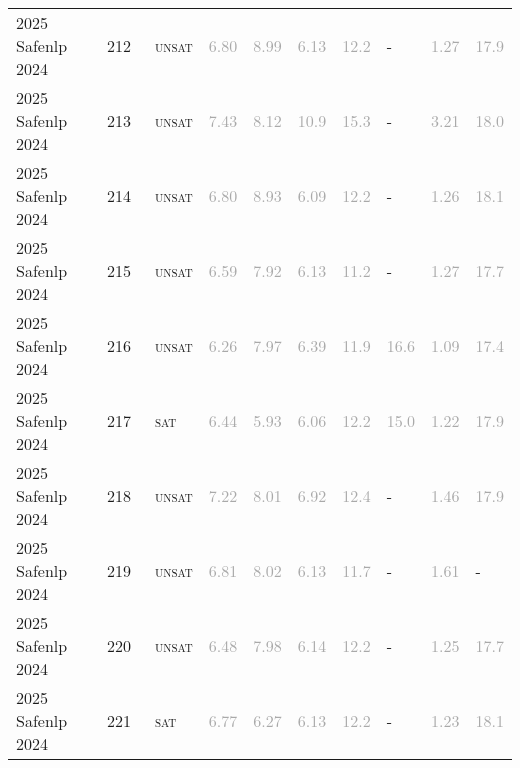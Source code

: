 \begin{center}
{\begin{longtable}{@{}llllllllll@{}}
2025 Safenlp 2024 & 212 & ~\textsc{unsat} & \textcolor{darkgray}{6.80} & \textcolor{darkgray}{8.99} & \textcolor{darkgray}{6.13} & \textcolor{darkgray}{12.2} & - & \textcolor{darkgray}{1.27} & \textcolor{darkgray}{17.9} \\
2025 Safenlp 2024 & 213 & ~\textsc{unsat} & \textcolor{darkgray}{7.43} & \textcolor{darkgray}{8.12} & \textcolor{darkgray}{10.9} & \textcolor{darkgray}{15.3} & - & \textcolor{darkgray}{3.21} & \textcolor{darkgray}{18.0} \\
2025 Safenlp 2024 & 214 & ~\textsc{unsat} & \textcolor{darkgray}{6.80} & \textcolor{darkgray}{8.93} & \textcolor{darkgray}{6.09} & \textcolor{darkgray}{12.2} & - & \textcolor{darkgray}{1.26} & \textcolor{darkgray}{18.1} \\
2025 Safenlp 2024 & 215 & ~\textsc{unsat} & \textcolor{darkgray}{6.59} & \textcolor{darkgray}{7.92} & \textcolor{darkgray}{6.13} & \textcolor{darkgray}{11.2} & - & \textcolor{darkgray}{1.27} & \textcolor{darkgray}{17.7} \\
2025 Safenlp 2024 & 216 & ~\textsc{unsat} & \textcolor{darkgray}{6.26} & \textcolor{darkgray}{7.97} & \textcolor{darkgray}{6.39} & \textcolor{darkgray}{11.9} & \textcolor{darkgray}{16.6} & \textcolor{darkgray}{1.09} & \textcolor{darkgray}{17.4} \\
2025 Safenlp 2024 & 217 & ~\textsc{sat} & \textcolor{darkgray}{6.44} & \textcolor{darkgray}{5.93} & \textcolor{darkgray}{6.06} & \textcolor{darkgray}{12.2} & \textcolor{darkgray}{15.0} & \textcolor{darkgray}{1.22} & \textcolor{darkgray}{17.9} \\
2025 Safenlp 2024 & 218 & ~\textsc{unsat} & \textcolor{darkgray}{7.22} & \textcolor{darkgray}{8.01} & \textcolor{darkgray}{6.92} & \textcolor{darkgray}{12.4} & - & \textcolor{darkgray}{1.46} & \textcolor{darkgray}{17.9} \\
2025 Safenlp 2024 & 219 & ~\textsc{unsat} & \textcolor{darkgray}{6.81} & \textcolor{darkgray}{8.02} & \textcolor{darkgray}{6.13} & \textcolor{darkgray}{11.7} & - & \textcolor{darkgray}{1.61} & - \\
2025 Safenlp 2024 & 220 & ~\textsc{unsat} & \textcolor{darkgray}{6.48} & \textcolor{darkgray}{7.98} & \textcolor{darkgray}{6.14} & \textcolor{darkgray}{12.2} & - & \textcolor{darkgray}{1.25} & \textcolor{darkgray}{17.7} \\
2025 Safenlp 2024 & 221 & ~\textsc{sat} & \textcolor{darkgray}{6.77} & \textcolor{darkgray}{6.27} & \textcolor{darkgray}{6.13} & \textcolor{darkgray}{12.2} & - & \textcolor{darkgray}{1.23} & \textcolor{darkgray}{18.1} \\

\end{longtable}}
\end{center}
